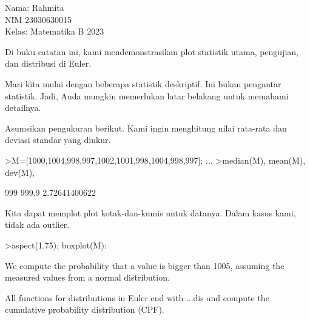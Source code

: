 \documentclass[a4paper,10pt]{article}
\begin{document}
\begin{eulernotebook}
\eulersubheading{}
\begin{eulercomment}
Nama: Rahmita\\
NIM 23030630015\\
Kelas: Matematika B 2023\\
\end{eulercomment}
\eulersubheading{}
\begin{eulercomment}
\begin{eulercomment}
\begin{eulercomment}
Di buku catatan ini, kami mendemonstrasikan plot statistik utama,
pengujian, dan distribusi di Euler.

Mari kita mulai dengan beberapa statistik deskriptif. Ini bukan
pengantar statistik. Jadi, Anda mungkin memerlukan latar belakang
untuk memahami detailnya.

Asumsikan pengukuran berikut. Kami ingin menghitung nilai rata-rata
dan deviasi standar yang diukur.
\end{eulercomment}
\begin{eulerprompt}
>M=[1000,1004,998,997,1002,1001,998,1004,998,997]; ...
>median(M), mean(M), dev(M),
\end{eulerprompt}
\begin{euleroutput}
  999
  999.9
  2.72641400622
\end{euleroutput}
\begin{eulercomment}
Kita dapat memplot plot kotak-dan-kumis untuk datanya. Dalam kasus
kami, tidak ada outlier.
\end{eulercomment}
\begin{eulerprompt}
>aspect(1.75); boxplot(M):
\end{eulerprompt}
\begin{eulercomment}
We compute the probability that a value is bigger than 1005, assuming the measured values from a normal distribution.

All functions for distributions in Euler end with ...dis and compute the cumulative probability distribution (CPF).


\end{eulercomment}
\end{eulercomment}
\end{eulercomment}
\end{eulernotebook}
\end{document}
